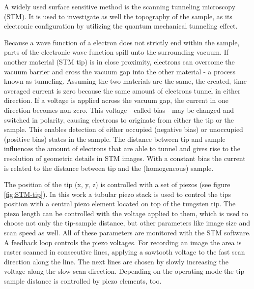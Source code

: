 A widely used surface sensitive method is the scanning tunneling microscopy (STM).  It is used to investigate as well the topography of the sample, as its electronic configuration by utilizing the quantum mechanical tunneling effect. 

Because a wave function of a electron does not strictly end within the sample, parts of the electronic wave function spill unto the surrounding vacuum. If another material (STM tip) is in close proximity, electrons can overcome the vacuum barrier and cross the vacuum gap into the other material - a process known as tunneling.  Assuming the two materials are the same, the created, time averaged current is zero because the same amount of electrons tunnel in either direction. If a voltage is applied across the vacuum gap, the current in one direction becomes non-zero. This voltage - called bias - may be changed and switched in polarity, causing electrons to originate from either the tip or the sample. This enables detection of either occupied (negative bias) or unoccupied (positive bias) states in the sample. The distance between tip and sample influences the amount of electrons that are able to tunnel and gives rise to the resolution of geometric details in STM images. With a constant bias the current is related to the distance between tip and the (homogeneous) sample.

The position of the tip (x, y, z) is controlled with a set of piezos (see figure \ref{fig:STM-tip}). In this work a tubular piezo stack is used to control the tips position with a central piezo element located on top of the tungsten tip. The piezo length can be controlled with the voltage applied to them, which is used to choose not only the tip-sample distance, but other parameters like image size and scan speed as well. All of these parameters are monitored with the STM software. A feedback loop controls the piezo voltages. For recording an image the area is raster scanned in consecutive lines, applying a sawtooth voltage to the fast scan direction along the line. The next lines are chosen by slowly increasing the voltage along the slow scan direction. Depending on the operating mode the tip-sample distance is controlled by piezo elements, too.

%

